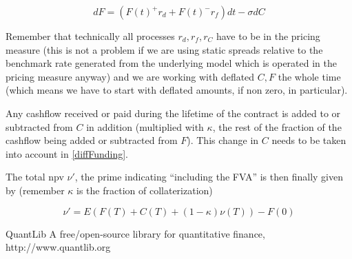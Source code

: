 \documentclass{amsart}
\theoremstyle{plain}
\numberwithin{equation}{section}
\begin{document}
\begin{equation}\label{diffFunding}
dF = ( F(t)^+ r_d + F(t)^- r_f ) dt  - \sigma dC
\end{equation}

Remember that technically all processes $r_d, r_f, r_C$ have to be in the pricing measure (this is not a problem if we are using static spreads relative to the benchmark rate generated from the underlying model which is operated in the pricing measure anyway) and we are working with deflated $C, F$ the whole time (which means we have to start with deflated amounts, if non zero, in particular).

Any cashflow received or paid during the lifetime of the contract is added to or subtracted from $C$ in addition (multiplied with $\kappa$, the rest of the fraction of the cashflow being added or subtracted from $F$). This change in $C$ needs to be taken into account in \ref{diffFunding}.

The total npv $\nu'$, the prime indicating ``including the FVA'' is then finally given by (remember $\kappa$ is the fraction of collaterization)

\begin{equation}
\nu' = E( F(T) + C(T) + (1-\kappa) \nu(T) ) - F(0)
\end{equation}




\begin{thebibliography}{2}

QuantLib A free/open-source library for quantitative finance, http://www.quantlib.org

\end{thebibliography}
\end{document}
